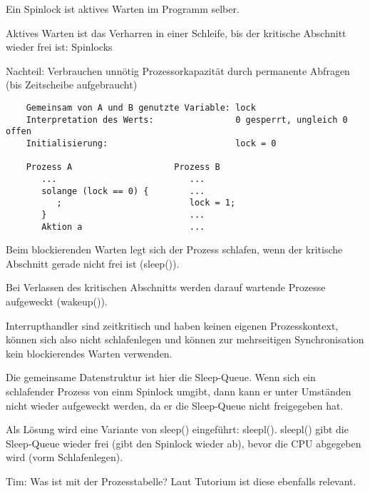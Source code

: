 \begin{answer}
Ein Spinlock ist aktives Warten im Programm selber.
\end{answer}

\begin{answer}
Aktives Warten ist das Verharren in einer Schleife, bis der kritische Abschnitt wieder frei ist: Spinlocks

Nachteil: Verbrauchen unnötig Prozessorkapazität durch permanente Abfragen (bis Zeitscheibe aufgebraucht)

\begin{verbatim}
    Gemeinsam von A und B genutzte Variable: lock
    Interpretation des Werts:                0 gesperrt, ungleich 0 offen 
    Initialisierung:                         lock = 0
           
    Prozess A                    Prozess B
       ...                          ...
       solange (lock == 0) {        ...
          ;                         lock = 1;
       }                            ...
       Aktion a                     ...
\end{verbatim}
\end{answer}

\begin{answer}
Beim blockierenden Warten legt sich der Prozess schlafen, wenn der kritische Abschnitt gerade nicht frei ist (sleep()).

Bei Verlassen des kritischen Abschnitts werden darauf wartende Prozesse aufgeweckt (wakeup()).

Interrupthandler sind zeitkritisch und haben keinen eigenen Prozesskontext, können sich also nicht schlafenlegen und können zur mehrseitigen Synchronisation kein blockierendes Warten verwenden.
\end{answer}

\begin{answer}
Die gemeinsame Datenstruktur ist hier die Sleep-Queue. Wenn sich ein schlafender Prozess von
einm Spinlock umgibt, dann kann er unter Umständen nicht wieder aufgeweckt werden, da er die
Sleep-Queue nicht freigegeben hat.

Als Lösung wird eine Variante von sleep() eingeführt: sleepl().
sleepl() gibt die Sleep-Queue wieder frei (gibt den Spinlock wieder ab), bevor die CPU abgegeben wird (vorm Schlafenlegen).

Tim: Was ist mit der Prozesstabelle? Laut Tutorium ist diese ebenfalls relevant.
\end{answer}

